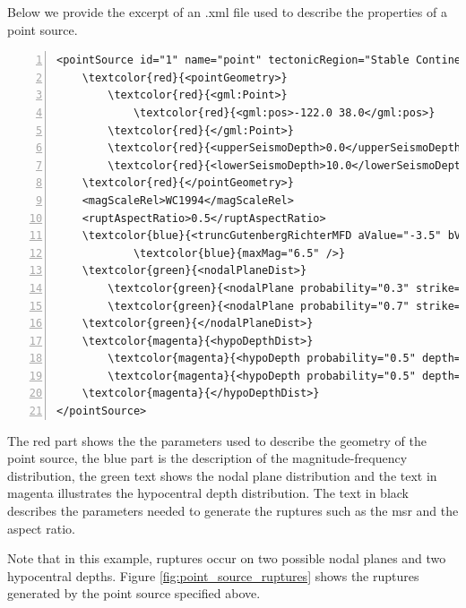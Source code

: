 Below we provide the excerpt of an .xml file used to describe the 
properties of a point source. 
\label{page:xml_point}
\begin{Verbatim}[frame=single, commandchars=\\\{\}, fontsize=\footnotesize,
    numbers=left, numbersep=2pt]
<pointSource id="1" name="point" tectonicRegion="Stable Continental Crust">
    \textcolor{red}{<pointGeometry>}
        \textcolor{red}{<gml:Point>}
            \textcolor{red}{<gml:pos>-122.0 38.0</gml:pos>}
        \textcolor{red}{</gml:Point>}
        \textcolor{red}{<upperSeismoDepth>0.0</upperSeismoDepth>}
        \textcolor{red}{<lowerSeismoDepth>10.0</lowerSeismoDepth>}
    \textcolor{red}{</pointGeometry>}
    <magScaleRel>WC1994</magScaleRel>
    <ruptAspectRatio>0.5</ruptAspectRatio>
    \textcolor{blue}{<truncGutenbergRichterMFD aValue="-3.5" bValue="1.0" minMag="5.0" }
			\textcolor{blue}{maxMag="6.5" />}
    \textcolor{green}{<nodalPlaneDist>}
        \textcolor{green}{<nodalPlane probability="0.3" strike="0.0" dip="90.0" rake="0.0" />}
        \textcolor{green}{<nodalPlane probability="0.7" strike="90.0" dip="45.0" rake="90.0" />}
    \textcolor{green}{</nodalPlaneDist>}
    \textcolor{magenta}{<hypoDepthDist>}
        \textcolor{magenta}{<hypoDepth probability="0.5" depth="4.0" />}
        \textcolor{magenta}{<hypoDepth probability="0.5" depth="8.0" />}
    \textcolor{magenta}{</hypoDepthDist>}
</pointSource>
\end{Verbatim}
The red part shows the the parameters used to 
describe the geometry of the point source, the blue part is the description
of the magnitude-frequency distribution, the green text shows the nodal 
plane distribution and the text in magenta illustrates the hypocentral depth 
distribution.
%
The text in black describes the parameters needed to generate the ruptures 
such as the \gls{msr} and the aspect ratio.

Note that in this example, ruptures occur on two possible nodal planes 
and two hypocentral depths. Figure \ref{fig:point_source_ruptures} shows 
the ruptures generated by the point source specified above.


